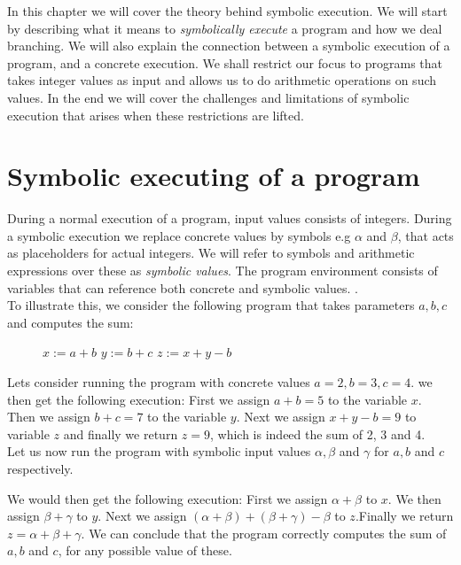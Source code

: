 In this chapter we will cover the theory behind symbolic execution. We will start by describing what it means to \emph{symbolically execute} a program and how we deal branching. We will also explain the connection between a symbolic execution of a program, and a concrete execution. We shall restrict our focus to programs that takes integer values as input and allows us to do arithmetic operations on such values. In the end we will cover the challenges and limitations of symbolic execution that arises when these restrictions are lifted. 


\section{Symbolic executing of a program}
	
	During a normal execution of a program, input values consists of integers. During a symbolic execution we replace concrete values by symbols e.g $\alpha$ and $ \beta$, that acts as placeholders for actual integers. We will refer to symbols and arithmetic expressions over these as \emph{symbolic values}.
	 The program environment consists of variables that can reference both concrete and symbolic values. \cite{CadarSen13}.
	\\
	To illustrate this, we consider the following program that takes parameters $a, b, c$ and computes the sum:
	\begin{figure}[!h]
		\begin{algorithmic}
			\State $ x := a + b$
			\State $ y := b + c$
			\State $ z := x + y - b$
			\State {}
			\EndProcedure
		\end{algorithmic}
	\end{figure}

	\sumprogram{}
	\newpage
	Lets consider running the program with concrete values $a = 2, b = 3, c = 4$. we then get the following execution:
	First we assign $a+b = 5$ to the variable $x$. Then we assign $b + c = 7$ to the variable $y$. Next we assign $x + y - b = 9$ to variable $z$ and finally we return $z = 9$, which is indeed the sum of 2, 3 and 4. 
	\\
	Let us now run the program with symbolic input values $\alpha, \beta$ and $\gamma$ for $a, b$ and $c$ respectively. 

	
	We would then get the following execution: First we assign $\alpha + \beta$ to $x$. We then assign $\beta + \gamma$ to $y$. Next we assign $(\alpha + \beta) + (\beta + \gamma) - \beta$ to $z$.Finally we return $z = \alpha + \beta + \gamma$. We can conclude that the program correctly computes the sum of $a, b$ and $c$, for any possible value of these.
	
